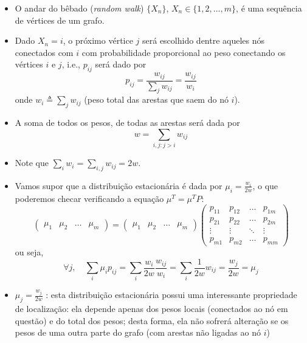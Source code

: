 \begin{frame}[allowframebreaks]
\begin{itemize}
  \item O andar do bêbado (\textit{random walk}) $\{ X_n \}$, $X_n \in \{1,2,\ldots,m\}$, é uma sequência de vértices de um grafo.
  \item Dado $X_n = i$, o próximo vértice $j$ será escolhido dentre aqueles nós conectados com $i$ com probabilidade proporcional
	ao peso conectando os vértices $i$ e $j$, i.e., $p_{ij}$ será dado por
	\begin{equation}
	p_{ij} = \frac{w_{ij}}{\sum_j w_{ij}} = \frac{w_{ij}}{w_i}
	\end{equation}
	onde $w_i \triangleq \sum_j w_{ij}$ (peso total das arestas que saem do nó $i$).
  \item A soma de todos os pesos, de todas as arestas será dada por
	\begin{equation}
	w = \sum_{i,j : j > i} w_{ij}
	\end{equation}
  \item Note que $\sum_i w_i = \sum_{i,j} w_{ij} = 2w$.
  \item Vamos supor que a distribuição estacionária é dada por $\mu_i = \frac{w_i}{2w}$, o que poderemos
	checar verificando a equação $\mu^T = \mu^T P$:
	\begin{equation}
	\begin{pmatrix} \mu_1 & \mu_2 & \ldots & \mu_m \end{pmatrix} =  
		\begin{pmatrix} \mu_1 & \mu_2 & \ldots & \mu_m \end{pmatrix}
 		\begin{pmatrix}
		p_{11} & p_{12} & \ldots & p_{1m} \\
		p_{21} & p_{22} & \ldots & p_{2m} \\
		\vdots & \vdots & \ddots & \vdots \\
		p_{m1} & p_{m2} & \ldots & p_{mm}
		\end{pmatrix}
	\end{equation}
	ou seja,
	\begin{equation}
	\forall j, \quad \sum_i \mu_i p_{ij} = \sum_i \frac{w_i}{2w} \frac{w_{ij}}{w_i} = \sum_i \frac{1}{2w} w_{ij} = \frac{w_j}{2w} = \mu_j
	\end{equation}
  \item $\mu_j = \frac{w_j}{2w}$ : esta distribuição estacionária possui uma interessante propriedade de localização:
	ela depende apenas dos pesos locais (conectados ao nó em questão) e do total dos pesos; desta forma, ela não 
	sofrerá alteração se os pesos de uma outra parte do grafo (com arestas não ligadas ao nó $i$) 

\end{itemize}
\end{frame}
